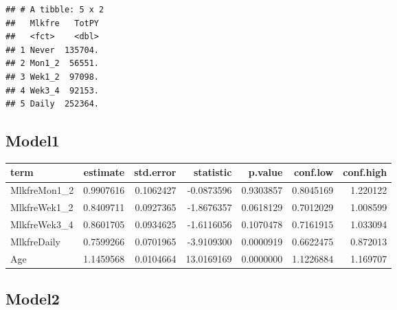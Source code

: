 \documentclass[
]{article}
\newenvironment{Shaded}{\begin{snugshade}}{\end{snugshade}}
\newcommand{\DataTypeTok}[1]{\textcolor[rgb]{0.13,0.29,0.53}{#1}}
\newcommand{\KeywordTok}[1]{\textcolor[rgb]{0.13,0.29,0.53}{\textbf{#1}}}
\newcommand{\NormalTok}[1]{#1}
\newcommand{\OperatorTok}[1]{\textcolor[rgb]{0.81,0.36,0.00}{\textbf{#1}}}
\newcommand{\OtherTok}[1]{\textcolor[rgb]{0.56,0.35,0.01}{#1}}
\newcommand{\StringTok}[1]{\textcolor[rgb]{0.31,0.60,0.02}{#1}}
\begin{document}
\begin{verbatim}
## # A tibble: 5 x 2
##   Mlkfre   TotPY
##   <fct>    <dbl>
## 1 Never  135704.
## 2 Mon1_2  56551.
## 3 Wek1_2  97098.
## 4 Wek3_4  92153.
## 5 Daily  252364.
\end{verbatim}

\hypertarget{model1-1}{%
\subsection{Model1}\label{model1-1}}

\begin{Shaded}
\end{Shaded}

\begin{longtable}[]{@{}lrrrrrr@{}}
\toprule
term & estimate & std.error & statistic & p.value & conf.low &
conf.high\tabularnewline
\midrule
\endhead
MlkfreMon1\_2 & 0.9907616 & 0.1062427 & -0.0873596 & 0.9303857 &
0.8045169 & 1.220122\tabularnewline
MlkfreWek1\_2 & 0.8409711 & 0.0927365 & -1.8676357 & 0.0618129 &
0.7012029 & 1.008599\tabularnewline
MlkfreWek3\_4 & 0.8601705 & 0.0934625 & -1.6116056 & 0.1070478 &
0.7161915 & 1.033094\tabularnewline
MlkfreDaily & 0.7599266 & 0.0701965 & -3.9109300 & 0.0000919 & 0.6622475
& 0.872013\tabularnewline
Age & 1.1459568 & 0.0104664 & 13.0169169 & 0.0000000 & 1.1226884 &
1.169707\tabularnewline
\bottomrule
\end{longtable}

\hypertarget{model2-1}{%
\subsection{Model2}\label{model2-1}}
\end{document}
